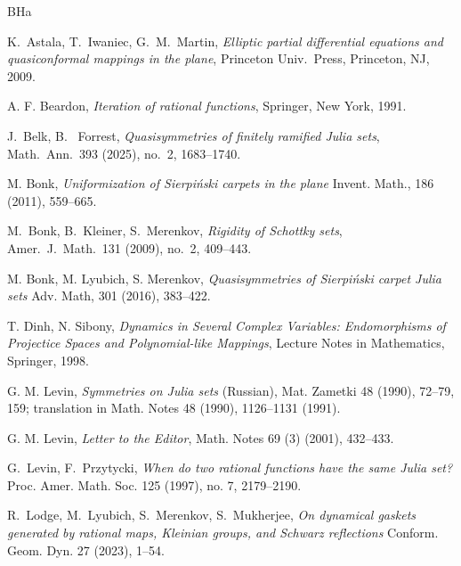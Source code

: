 \documentclass[12pt]{amsart}
\newtheorem*{rmk}{Remark}
\begin{document}


\begin{thebibliography}{BHa}


 K.~Astala, T.~Iwaniec, G.~M.~Martin, \emph{Elliptic partial differential equations and quasiconformal mappings in the plane}, Princeton Univ.\ Press, Princeton, NJ, 2009.  


 A. F. Beardon, {\em Iteration of rational functions}, Springer, New York, 1991. 

 J.~Belk, B.~ Forrest,  \emph{Quasisymmetries of finitely ramified Julia sets}, Math.\ Ann.\ 393 (2025), no.\ 2, 1683--1740.


 M. Bonk, \emph{Uniformization of Sierpi\'nski carpets in the plane} Invent. Math., 186 (2011), 559--665.


 M.~Bonk, B.~Kleiner, S.~Merenkov, \emph{Rigidity of Schottky sets},
Amer.\ J.\ Math.\ 131 (2009), no.\ 2, 409--443.


 M. Bonk, M. Lyubich, S. Merenkov, \emph{Quasisymmetries of Sierpi\'nski carpet Julia sets} Adv. Math, 301 (2016), 383--422.



 T. Dinh, N. Sibony, {\em Dynamics in Several Complex Variables: Endomorphisms of Projectice Spaces and Polynomial-like Mappings}, Lecture Notes in Mathematics, Springer, 1998.


 G. M. Levin, \emph{Symmetries on Julia sets} (Russian), Mat. Zametki 48 (1990),   72--79, 159; translation in Math. Notes 48 (1990),  1126--1131 (1991).

 G. M. Levin, \emph{Letter to the Editor}, Math. Notes 69 (3) (2001), 432--433.


 G.~Levin, F.~Przytycki, 
\emph{When do two rational functions have the same Julia set?}
Proc. Amer. Math. Soc. 125 (1997), no. 7, 2179--2190.


 R.~Lodge, M.~Lyubich, S.~Merenkov, S.~Mukherjee,  \emph{On dynamical gaskets generated by rational maps, Kleinian groups, and Schwarz reflections} 
Conform. Geom. Dyn. 27 (2023), 1--54.


\end{thebibliography}
\end{document}
